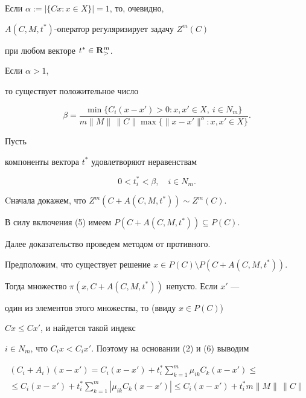 \begin{pf}


Если $\alpha:= | \{Cx: x\in X\} |=1$, то, очевидно, 


$A(C, M, t^*)$-оператор регуляризирует задачу $Z^m(C)$


при любом векторе $t^*\in {\bold R}_>^m$.


Если $\alpha > 1$,


то существует положительное число


$$


\beta=


\frac{\min\{C_i(x-x')>0: x,x'\in X,\ i\in N_m\}}


{m\| M\|\, \| C\|\max


\{\| x-x'\|^o: x,x'\in X\}}.


$$


Пусть


компоненты вектора $t^*$ удовлетворяют неравенствам


\begin{equation}


0<t^*_i< \beta,\quad i\in N_m.


\end{equation}





Cначала докажем, что $Z^m(C+A(C, M, t^*))\sim Z^m(C)$.


В силу включения (5) имеем $P(C+A(C, M, t^*))\subseteq P(C)$.


Далее доказательство проведем методом от противного.


Предположим, что существует решение $x\in P(C)\setminus P(C+A(C, M, t^*))$.


Тогда множество $\pi(x, C+A(C, M, t^*))$ непусто. Если $x'$ ---


один из элементов этого множества, то (ввиду $x\in P(C)$)


$Cx\le Cx'$, и найдется такой индекс


$i\in N_m$, что $C_ix<C_ix'$. Поэтому на основании (2) и (6) выводим


\begin{multline*}


(C_i+A_i)(x-x') = C_i(x-x')+t^*_i\sum_{k=1}^m\mu_{ik}C_k(x-x')\le \\


%


\le C_i(x-x')+t^*_i\sum_{k=1}^m|\mu_{ik}C_k(x-x')|\le


C_i(x-x')+t_i^* m\| M\|\,\| C\|



\end{multline*}
\end{pf}
